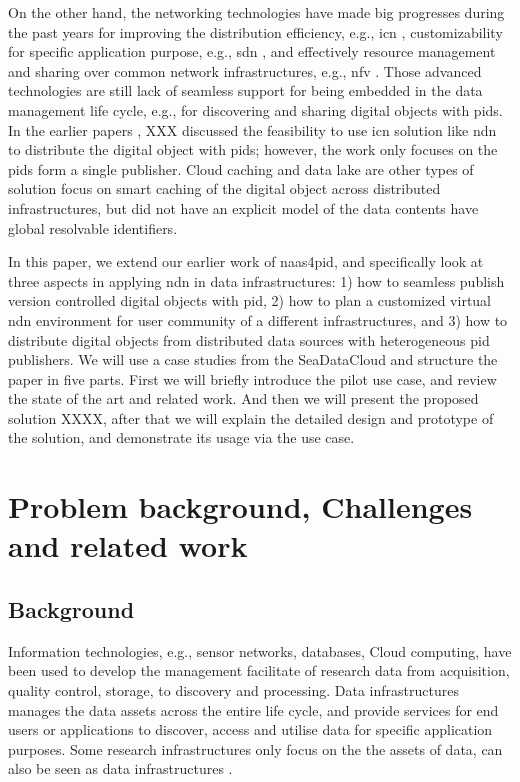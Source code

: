 \documentclass[conference]{IEEEtran}
\begin{document}
On the other hand, the networking technologies have made big progresses during the past years for improving the distribution efficiency, e.g., \gls{icn} \cite{}, customizability for specific application purpose, e.g., \gls{sdn} \cite{}, and effectively resource management and sharing over common network infrastructures, e.g., \gls{nfv} \cite{}. Those advanced technologies are still lack of seamless support for being embedded in the data management life cycle, e.g., for discovering and sharing digital objects with \glspl{pid}. In the earlier papers \cite{}, XXX discussed the feasibility to use \gls{icn} solution like \gls{ndn} to distribute the digital object with \glspl{pid}; however, the work only focuses on the \glspl{pid} form a single publisher. Cloud caching \cite{} and data lake \cite{} are other types of solution focus on smart caching of the digital object across distributed infrastructures, but did not have an explicit model of the data contents have global resolvable identifiers.

In this paper, we extend our earlier work of \gls{naas4pid}, and specifically look at three aspects in applying \gls{ndn} in data infrastructures: 1) how to seamless publish version controlled digital objects with \gls{pid}, 2) how to plan a customized virtual \gls{ndn} environment for user community of a different infrastructures, and 3) how to distribute digital objects from distributed data sources with heterogeneous \gls{pid} publishers. We will use a case studies from the SeaDataCloud and structure the paper in five parts. First we will briefly introduce the pilot use case, and review the state of the art and related work. And then we will present the proposed solution XXXX, after that we will explain the detailed design and prototype of the solution, and demonstrate its usage via the use case.




\section{Problem background, Challenges and related work}
\subsection{Background}
Information technologies, e.g., sensor networks, databases, Cloud computing, have been used to develop the management facilitate of research data from acquisition, quality control, storage, to discovery and processing. Data infrastructures \cite{} manages the data assets across the entire life cycle, and provide services for end users or applications to discover, access and utilise data for specific application purposes. Some research infrastructures only focus on the the assets of data, can also be seen as data infrastructures \cite{}. 
\end{document}
